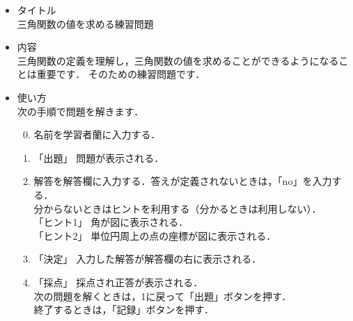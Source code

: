 \documentclass[20]{jarticle}
\begin{document}
\begin{itemize}
\item タイトル\\
三角関数の値を求める練習問題
\item 内容\\
三角関数の定義を理解し，三角関数の値を求めることができるようになることは重要です．
そのための練習問題です．

\item 使い方\\
次の手順で問題を解きます．
\begin{enumerate}
\setcounter{enumi}{-1}
\item 名前を学習者蘭に入力する．
\item 「出題」 問題が表示される．
\item 解答を解答欄に入力する．答えが定義されないときは，「no」を入力する．\\[1mm]
分からないときはヒントを利用する（分かるときは利用しない）．\\[1mm]
\hspace{1zw}「ヒント1」 角が図に表示される．\\[1mm]
\hspace{1zw}「ヒント2」 単位円周上の点の座標が図に表示される．
\item 「決定」 入力した解答が解答欄の右に表示される．
\item 「採点」 採点され正答が表示される．\\[1mm]
\hspace{2zw}次の問題を解くときは，1に戻って「出題」ボタンを押す．\\[1mm]
\hspace{2zw}終了するときは，「記録」ボタンを押す．


\end{enumerate}

\end{itemize}
\end{document}
